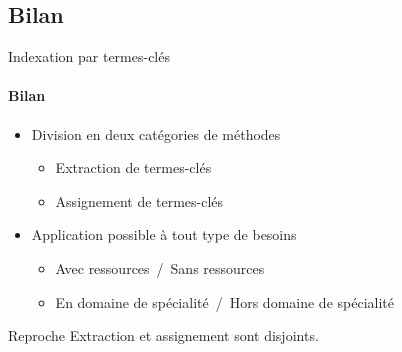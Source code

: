   \subsection{Bilan}
  \begin{frame}{Indexation par termes-clés}\framesubtitle{Bilan}
    \begin{itemize}
      \item{Division en deux catégories de méthodes}
      \begin{itemize}
        \item{Extraction de termes-clés}
        \item{Assignement de termes-clés}
      \end{itemize}
      \item{Application possible à tout type de besoins}
      \begin{itemize}
        \item{Avec ressources~/~Sans ressources}
        \item{En domaine de spécialité~/~Hors domaine de spécialité}
      \end{itemize}
    \end{itemize}

    \vspace{1em}

    \begin{alertblock}{Reproche}
      Extraction et assignement sont disjoints.
    \end{alertblock}
  \end{frame}
